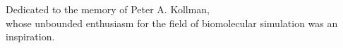 Dedicated to the memory of Peter A. Kollman,\\\vspace{12pt}
whose unbounded enthusiasm for the field of biomolecular simulation was an inspiration.
 